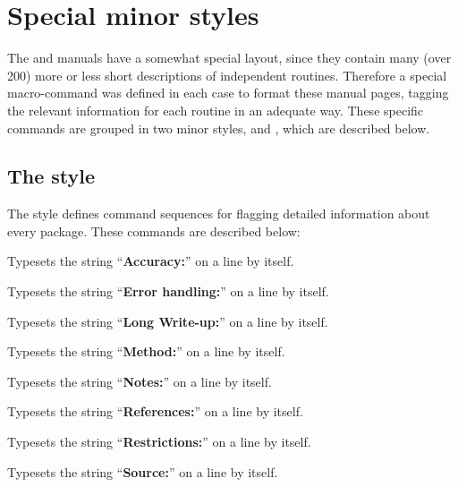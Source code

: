 \chapter{Special minor styles}

The \CERNLIB{} and \GEANT{} manuals have a somewhat special layout,
since they contain many (over 200) more or less short descriptions
of independent routines.
Therefore a special macro-command was defined in each case to
format these manual pages, tagging the relevant information
for each routine in an adequate way.
These specific commands are grouped in two minor styles,
 and , which are described below.

\section{The \protect{} style}

The  style defines command sequences 
for flagging detailed information about every package.
These commands are described below:


Typesets the string ``\textbf{Accuracy:}'' on a line by itself.


Typesets the string ``\textbf{Error handling:}'' on a line by itself.


Typesets the string ``\textbf{Long Write-up:}'' on a line by itself.


Typesets the string ``\textbf{Method:}'' on a line by itself.


Typesets the string ``\textbf{Notes:}'' on a line by itself.


Typesets the string ``\textbf{References:}'' on a line by itself.


Typesets the string ``\textbf{Restrictions:}'' on a line by itself.


Typesets the string ``\textbf{Source:}'' on a line by itself.

